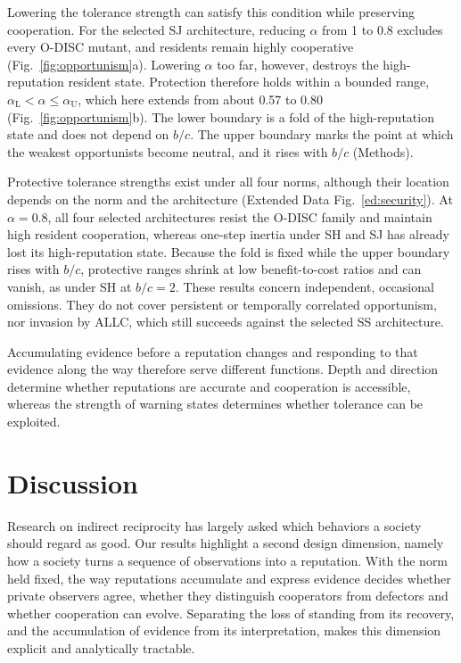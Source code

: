 \documentclass[fleqn,10pt]{wlscirep}
\newif\ifdraftnotes
\DeclareRobustCommand{\draftnote}[1]{%
  \ifdraftnotes{\color{red!60!black}\sffamily\footnotesize[#1]}\fi}
\theoremstyle{plain}
\begin{document}
Lowering the tolerance strength can satisfy this condition while preserving cooperation. For the selected SJ architecture, reducing $\alpha$ from 1 to 0.8 excludes every O-DISC mutant, and residents remain highly cooperative (Fig.~\ref{fig:opportunism}a). Lowering $\alpha$ too far, however, destroys the high-reputation resident state. Protection therefore holds within a bounded range, $\alpha_{\mathrm L}<\alpha\leq\alpha_{\mathrm U}$, which here extends from about 0.57 to 0.80 (Fig.~\ref{fig:opportunism}b). The lower boundary is a fold of the high-reputation state and does not depend on $b/c$. The upper boundary marks the point at which the weakest opportunists become neutral, and it rises with $b/c$ (Methods).

Protective tolerance strengths exist under all four norms, although their location depends on the norm and the architecture (Extended Data Fig.~\ref{ed:security}). At $\alpha=0.8$, all four selected architectures resist the O-DISC family and maintain high resident cooperation, whereas one-step inertia under SH and SJ has already lost its high-reputation state. Because the fold is fixed while the upper boundary rises with $b/c$, protective ranges shrink at low benefit-to-cost ratios and can vanish, as under SH at $b/c=2$. These results concern independent, occasional omissions. They do not cover persistent or temporally correlated opportunism, nor invasion by ALLC, which still succeeds against the selected SS architecture.

Accumulating evidence before a reputation changes and responding to that evidence along the way therefore serve different functions. Depth and direction determine whether reputations are accurate and cooperation is accessible, whereas the strength of warning states determines whether tolerance can be exploited.

\section*{Discussion}
\draftnote{Expanded Discussion (revision 2), to be revised further.}

Research on indirect reciprocity has largely asked which behaviors a society should regard as good\cite{ohtsuki2004,ohtsuki2006,santos2018,kessinger2023}. Our results highlight a second design dimension, namely how a society turns a sequence of observations into a reputation. With the norm held fixed, the way reputations accumulate and express evidence decides whether private observers agree, whether they distinguish cooperators from defectors and whether cooperation can evolve. Separating the loss of standing from its recovery, and the accumulation of evidence from its interpretation, makes this dimension explicit and analytically tractable.
\end{document}
